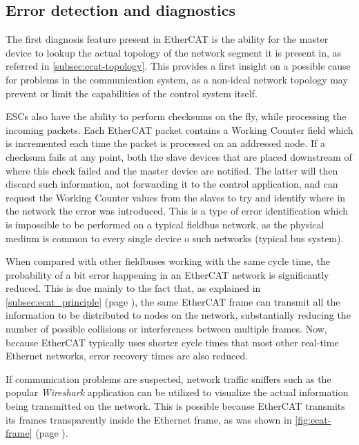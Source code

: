 \subsection{Error detection and diagnostics}

The first diagnosis feature present in EtherCAT is the ability for the master device to lookup the actual topology of the network segment it is present in, as referred in \autoref{subsec:ecat-topology}.
This provides a first insight on a possible cause for problems in the communication system, as a non-ideal network topology may prevent or limit the capabilities of the control system itself.

ESCs also have the ability to perform checksums on the fly, while processing the incoming packets.
Each EtherCAT packet contains a Working Counter field which is incremented each time the packet is processed on an addressed node.
If a checksum fails at any point, both the slave devices that are placed downstream of where this check failed and the master device are notified.
The latter will then discard such information, not forwarding it to the control application, and can request the Working Counter values from the slaves to try and identify where in the network the error was introduced.
This is a type of error identification which is impossible to be performed on a typical fieldbus network, as the physical medium is common to every single device o such networks (typical bus system).

When compared with other fieldbuses working with the same cycle time, the probability of a bit error happening in an EtherCAT network is significantly reduced.
This is due mainly to the fact that, as explained in \autoref{subsec:ecat_principle} (page \pageref{subsec:ecat_principle}), the same EtherCAT frame can transmit all the information to be distributed to nodes on the network, substantially reducing the number of possible collisions or interferences between multiple frames.
Now, because EtherCAT typically uses shorter cycle times that most other real-time Ethernet networks, error recovery times are also reduced.

If communication problems are suspected, network traffic sniffers such as the popular \emph{Wireshark} application can be utilized to visualize the actual information being transmitted on the network.
This is possible because EtherCAT transmits its frames transparently inside the Ethernet frame, as was shown in \autoref{fig:ecat-frame} (page \pageref{fig:ecat-frame}).
